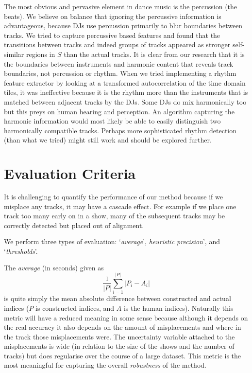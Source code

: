 \documentclass[twocolumn]{article}
\begin{document}
	The most obvious and pervasive element in dance music is the percussion (the beats). We believe on balance that ignoring the percussive information is advantageous, because DJs use percussion primarily to blur boundaries between tracks.  We tried to capture percussive based features and found that the transitions between tracks and indeed groups of tracks appeared as stronger self-similar regions in $S$ than the actual tracks. It is clear from our research that it is the boundaries between instruments and harmonic content that reveals track boundaries, not percussion or rhythm. When we tried implementing a rhythm feature extractor by looking at a transformed autocorrelation of the time domain tiles, it was ineffective because it is the rhythm more than the instruments that is matched between adjacent tracks by the DJs. Some DJs do mix harmonically too but this preys on human hearing and perception. An algorithm capturing the harmonic information would most likely be able to easily distinguish two harmonically compatible tracks. Perhaps more sophisticated rhythm detection (than what we tried) might still work and should be explored further. 
	
	
	\section{Evaluation Criteria}\label{eval_crit}
	
	It is challenging to quantify the performance of our method because if we misplace any tracks, it may have a cascade effect. For example if we place one track too many early on in a show, many of the subsequent tracks may be correctly detected but placed out of alignment. 
	
	We perform three types of evaluation: `\textit{average}', \textit{heuristic precision}', and `\textit{thresholds}'.
	
	The \textit{average} (in seconds) given as $$\frac{1}{|P|}\sum_{i=1}^{|P|}{|P_i-A_i|}$$ is quite simply the mean absolute difference between constructed and actual indices ($P$ is constructed indices, and $A$ is the human indices). Naturally this metric will have a reduced meaning in some sense because although it depends on the real accuracy it also depends on the amount of misplacements and where in the track those misplacements were. The uncertainty variable attached to the misplacements is wide (in relation to the size of the shows and the number of tracks) but does regularise over the course of a large dataset. This metric is the most meaningful for capturing the overall \textit{robustness} of the method.
	
\end{document}
